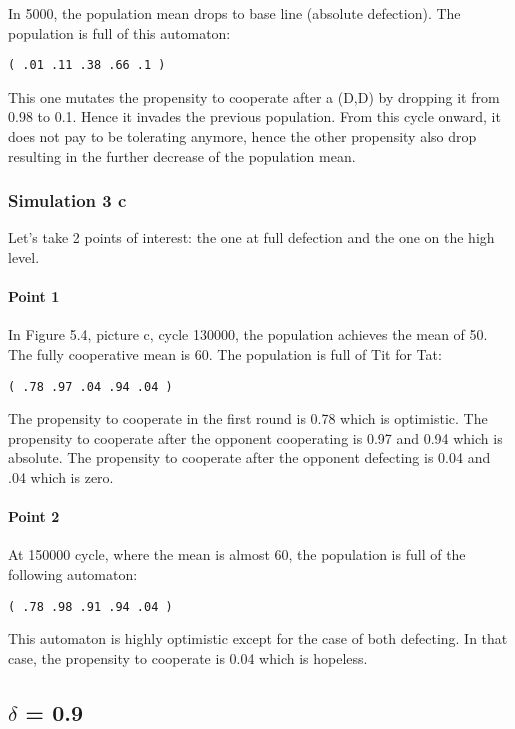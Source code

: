 \documentclass[12.5pt]{report}
\begin{document}
In 5000, the population mean drops to base line (absolute defection). The population is full of this automaton:
\begin{verbatim}
( .01 .11 .38 .66 .1 )
\end{verbatim}

This one mutates the propensity to cooperate after a (D,D) by dropping it from 0.98 to 0.1. Hence it invades the previous population. From this cycle onward, it does not pay to be tolerating anymore, hence the other propensity also drop resulting in the further decrease of the population mean.

\subsubsection{Simulation 3 c}
Let's take 2 points of interest: the one at full defection and the one on the high level.

\paragraph{Point 1}

In Figure 5.4, picture c, cycle 130000, the population achieves the mean of 50. The fully cooperative mean is 60. The population is full of Tit for Tat:
\begin{verbatim}
( .78 .97 .04 .94 .04 )
\end{verbatim}

The propensity to cooperate in the first round is 0.78 which is optimistic. The propensity to cooperate after the opponent cooperating is 0.97 and 0.94 which is absolute. The propensity to cooperate after the opponent defecting is 0.04 and .04  which is zero.

\paragraph{Point 2}

At 150000 cycle, where the mean is almost 60, the population is full of the following automaton:
\begin{verbatim}
( .78 .98 .91 .94 .04 ) 
\end{verbatim}

This automaton is highly optimistic except for the case of both defecting. In that case, the propensity to cooperate is 0.04 which is hopeless.

\subsection{$\delta$ = 0.9}
\end{document}
